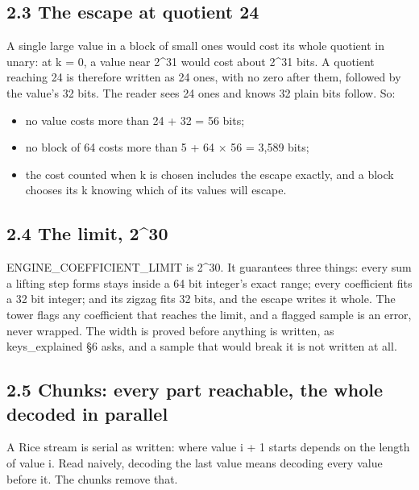 \subsection{\texorpdfstring{2.3 The escape at quotient 24}{2.3 The escape at quotient 24}}

A single large value in a block of small ones would cost its whole quotient in unary: at k = 0, a value near 2\textasciicircum{}31 would cost about 2\textasciicircum{}31 bits. A quotient reaching 24 is therefore written as 24 ones, with no zero after them, followed by the value's 32 bits. The reader sees 24 ones and knows 32 plain bits follow. So:

\begin{itemize}
\item no value costs more than 24 + 32 = 56 bits;
\item no block of 64 costs more than 5 + 64 × 56 = 3,589 bits;
\item the cost counted when k is chosen includes the escape exactly, and a block chooses its k knowing which of its values will escape.
\end{itemize}

\subsection{\texorpdfstring{2.4 The limit, 2\textasciicircum{}30}{2.4 The limit, 2\textasciicircum{}30}}

ENGINE\_\allowbreak{}COEFFICIENT\_\allowbreak{}LIMIT is 2\textasciicircum{}30. It guarantees three things: every sum a lifting step forms stays inside a 64 bit integer's exact range; every coefficient fits a 32 bit integer; and its zigzag fits 32 bits, and the escape writes it whole. The tower flags any coefficient that reaches the limit, and a flagged sample is an error, never wrapped. The width is proved before anything is written, as keys\_\allowbreak{}explained §6 asks, and a sample that would break it is not written at all.

\subsection{\texorpdfstring{2.5 Chunks: every part reachable, the whole decoded in parallel}{2.5 Chunks: every part reachable, the whole decoded in parallel}}

A Rice stream is serial as written: where value i + 1 starts depends on the length of value i. Read naively, decoding the last value means decoding every value before it. The chunks remove that.

